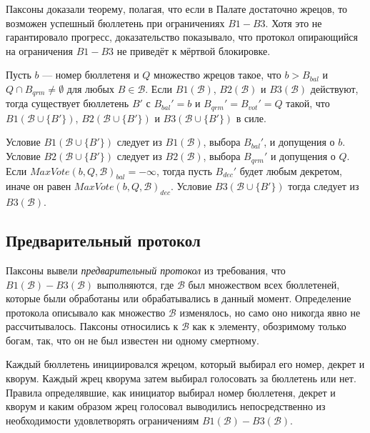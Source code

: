 \documentclass[12pt, a4paper]{article} %
\begin{document}
Паксоны доказали теорему, полагая, что если в Палате достаточно жрецов, то возможен успешный бюллетень при ограничениях $B1-B3$. Хотя это не гарантировало прогресс, доказательство показывало, что протокол опирающийся на ограничения $B1-B3$ не приведёт к мёртвой блокировке.

\begin{theorem}
Пусть $b$ --- номер бюллетеня и $Q$ множество жрецов такое, что $b > B_{bal}$ и $Q \cap B_{qrm} \neq \emptyset$ для любых $B \in \mathcal{B}$. Если $B1(\mathcal{B})$, $B2(\mathcal{B})$ и $B3(\mathcal{B})$ действуют, тогда существует бюллетень $B'$ с $B_{bal}' = b$ и $B_{qrm}' = B_{vot}' = Q$ такой, что $B1(\mathcal{B} \cup \{B'\})$, $B2(\mathcal{B} \cup \{B'\})$ и $B3(\mathcal{B} \cup \{B'\})$ в силе.
\end{theorem}
\begin{theoremproof}
Условие $B1(\mathcal{B} \cup \{B'\})$ следует из $B1(\mathcal{B})$, выбора $B_{bal}'$, и допущения о $b$. Условие  $B2(\mathcal{B} \cup \{B'\})$ следует из  $B2(\mathcal{B})$, выбора $B_{qrm}'$ и допущения о $Q$. Если $MaxVote(b, Q, \mathcal{B})_{bal} = - \infty$, тогда пусть $B_{dec}'$ будет любым декретом, иначе он равен $MaxVote(b, Q, \mathcal{B})_{dec}$. Условие $B3(\mathcal{B} \cup \{B'\})$ тогда следует из $B3(\mathcal{B})$.
\end{theoremproof}

\subsection{Предварительный протокол}\label{sec:preliminaryprot}

Паксоны вывели \textit{предварительный протокол} из требования, что $B1(\mathcal{B}) - B3(\mathcal{B})$ выполняются, где $\mathcal{B}$ был множеством всех бюллетеней, которые были обработаны или обрабатывались в данный момент. Определение протокола описывало как множество $\mathcal{B}$ изменялось, но само оно никогда явно не рассчитывалось. Паксоны относились к $\mathcal{B}$ как к элементу, обозримому только богам, так, что он не был известен ни одному смертному.

Каждый бюллетень инициировался жрецом, который выбирал его номер, декрет и кворум. Каждый жрец кворума затем выбирал голосовать за бюллетень или нет. Правила определявшие, как инициатор выбирал номер бюллетеня, декрет и кворум и каким образом жрец голосовал выводились непосредственно из необходимости удовлетворять ограничениям $B1(\mathcal{B}) - B3(\mathcal{B})$.
\end{document}
